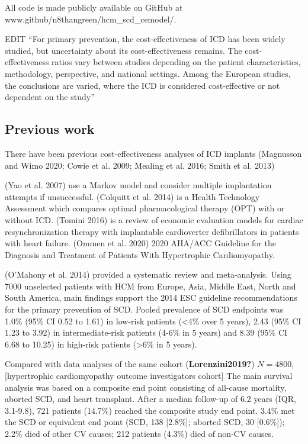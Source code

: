 \documentclass[
]{article}
\begin{document}
All code is made publicly available on GitHub at
www.github/n8thangreen/hcm\_scd\_cemodel/.

EDIT ``For primary prevention, the cost-effectiveness of ICD has been
widely studied, but uncertainty about its cost-effectiveness remains.
The cost-effectiveness ratios vary between studies depending on the
patient characteristics, methodology, perspective, and national
settings. Among the European studies, the conclusions are varied, where
the ICD is considered cost-effective or not dependent on the study''

\hypertarget{previous-work}{%
\subsection{Previous work}\label{previous-work}}

There have been previous cost-effectiveness analyses of ICD implants
(Magnusson and Wimo 2020; Cowie et al. 2009; Mealing et al. 2016; Smith
et al. 2013)

(Yao et al. 2007) use a Markov model and consider multiple implantation
attempts if unsuccessful. (Colquitt et al. 2014) is a Health Technology
Assessment which compares optimal pharmacological therapy (OPT) with or
without ICD. (Tomini 2016) is a review of economic evaluation models for
cardiac resynchronization therapy with implantable cardioverter
defibrillators in patients with heart failure. (Ommen et al. 2020) 2020
AHA/ACC Guideline for the Diagnosis and Treatment of Patients With
Hypertrophic Cardiomyopathy.

(O'Mahony et al. 2014) provided a systematic review and meta-analysis.
Using 7000 unselected patients with HCM from Europe, Asia, Middle East,
North and South America, main findings support the 2014 ESC guideline
recommendations for the primary prevention of SCD. Pooled prevalence of
SCD endpoints was 1.0\% (95\% CI 0.52 to 1.61) in low-risk patients
(\textless4\% over 5 years), 2.43 (95\% CI 1.23 to 3.92) in
intermediate-risk patients (4-6\% in 5 years) and 8.39 (95\% CI 6.68 to
10.25) in high-risk patients (\textgreater6\% in 5 years).

Compared with data analyses of the same cohort (\textbf{Lorenzini2019?})
\(N=4800\), {[}hypertrophic cardiomyopathy outcome investigators
cohort{]} The main survival analysis was based on a composite end point
consisting of all-cause mortality, aborted SCD, and heart transplant.
After a median follow-up of 6.2 years (IQR, 3.1-9.8), 721 patients
(14.7\%) reached the composite study end point. 3.4\% met the SCD or
equivalent end point (SCD, 138 {[}2.8\%{]}; aborted SCD, 30
{[}0.6\%{]}); 2.2\% died of other CV causes; 212 patients (4.3\%) died
of non-CV causes.
\end{document}
